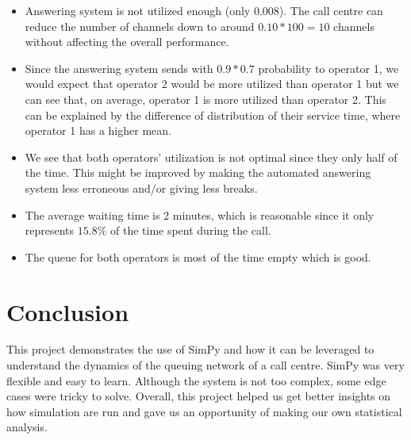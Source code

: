 \documentclass{article}
\begin{document}
\begin{itemize}
    \item Answering system is not utilized enough (only $0.008$). The call centre can reduce the number of channels down to around $0.10 * 100 = 10$ channels without affecting the overall performance.
    \item Since the answering system sends with $0.9 * 0.7$ probability to operator 1, we would expect that operator 2 would be more utilized than operator 1 but we can see that, on average, operator 1 is more utilized than operator 2. This can be explained by the difference of distribution of their service time, where operator 1 has a higher mean.
    \item We see that both operators' utilization is not optimal since they only half of the time. This might be improved by making the automated answering system less erroneous and/or giving less breaks.
    \item The average waiting time is 2 minutes, which is reasonable since it only represents $15.8\%$ of the time spent during the call.
    \item The queue for both operators is most of the time empty which is good.
\end{itemize}

\section{Conclusion}
This project demonstrates the use of SimPy and how it can be leveraged to understand the dynamics of the queuing
network of a call centre. SimPy was very flexible and easy to learn. Although the system is not too complex, some
edge cases were tricky to solve. Overall, this project helped us get better insights on how simulation are run and
gave us an opportunity of making our own statistical analysis.
\end{document}
